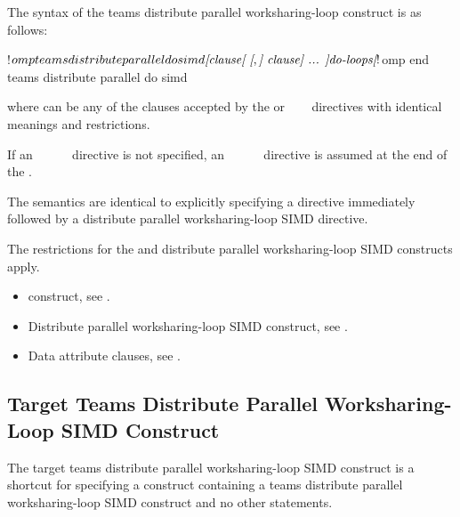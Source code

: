 \begin{fortranspecific}
The syntax of the teams distribute parallel worksharing-loop construct is as follows:

\begin{ompfPragma}
!$omp teams distribute parallel do simd \plc{[clause[ [},\plc{] clause] ... ]}
    \plc{do-loops}
\plc{[}!$omp end teams distribute parallel do simd\plc{]}
\end{ompfPragma}

where  can be any of the clauses accepted by the  or
~~~
directives with identical meanings and restrictions.

If an ~~~~~ directive is not specified, an
~~~~~ directive is assumed at the end of
the .
\end{fortranspecific}

\descr
The semantics are identical to explicitly specifying a  directive immediately
followed by a distribute parallel worksharing-loop SIMD directive. 

\restrictions
The restrictions for the  and distribute parallel worksharing-loop
SIMD constructs apply.

\crossreferences
\begin{itemize}
\item {} construct, see
.

\item Distribute parallel worksharing-loop SIMD construct, see
.

\item Data attribute clauses, see
.
\end{itemize}










\subsection{Target Teams Distribute Parallel Worksharing-Loop SIMD Construct}
\label{subsec:Target Teams Distribute Parallel Loop SIMD Construct}
\summary
The target teams distribute parallel worksharing-loop SIMD construct is a shortcut for specifying a 
construct containing a teams distribute parallel worksharing-loop SIMD construct and no other statements.

